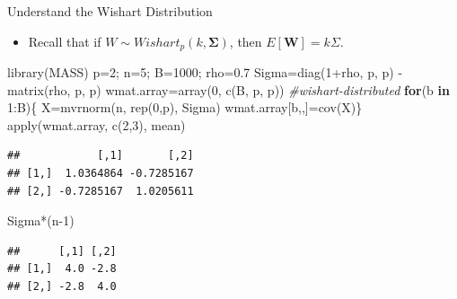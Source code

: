 \documentclass[
  ignorenonframetext,
]{beamer}
\newenvironment{Shaded}{\begin{snugshade}}{\end{snugshade}}
\newcommand{\CommentTok}[1]{\textcolor[rgb]{0.56,0.35,0.01}{\textit{#1}}}
\newcommand{\ControlFlowTok}[1]{\textcolor[rgb]{0.13,0.29,0.53}{\textbf{#1}}}
\newcommand{\DecValTok}[1]{\textcolor[rgb]{0.00,0.00,0.81}{#1}}
\newcommand{\FloatTok}[1]{\textcolor[rgb]{0.00,0.00,0.81}{#1}}
\newcommand{\FunctionTok}[1]{\textcolor[rgb]{0.00,0.00,0.00}{#1}}
\newcommand{\NormalTok}[1]{#1}
\newcommand{\OtherTok}[1]{\textcolor[rgb]{0.56,0.35,0.01}{#1}}
\newcommand{\SpecialCharTok}[1]{\textcolor[rgb]{0.00,0.00,0.00}{#1}}
\providecommand{\tightlist}{%
  \setlength{\itemsep}{0pt}\setlength{\parskip}{0pt}}
\begin{document}
\begin{frame}[fragile]{Understand the Wishart Distribution}
\protect\hypertarget{understand-the-wishart-distribution}{}
\begin{itemize}
\tightlist
\item
  Recall that if \(W\sim Wishart_p(k, \boldsymbol \Sigma)\), then
  \(E[\mathbf W]=k\Sigma\).
\end{itemize}

\tiny

\begin{Shaded}
\begin{Highlighting}[]
\FunctionTok{library}\NormalTok{(MASS)}
\NormalTok{p}\OtherTok{=}\DecValTok{2}\NormalTok{; n}\OtherTok{=}\DecValTok{5}\NormalTok{; B}\OtherTok{=}\DecValTok{1000}\NormalTok{; rho}\OtherTok{=}\FloatTok{0.7}
\NormalTok{Sigma}\OtherTok{=}\FunctionTok{diag}\NormalTok{(}\DecValTok{1}\SpecialCharTok{+}\NormalTok{rho, p, p) }\SpecialCharTok{{-}} \FunctionTok{matrix}\NormalTok{(rho, p, p)}
\NormalTok{wmat.array}\OtherTok{=}\FunctionTok{array}\NormalTok{(}\DecValTok{0}\NormalTok{, }\FunctionTok{c}\NormalTok{(B, p, p)) }\CommentTok{\#wishart{-}distributed}
\ControlFlowTok{for}\NormalTok{(b }\ControlFlowTok{in} \DecValTok{1}\SpecialCharTok{:}\NormalTok{B)\{}
\NormalTok{  X}\OtherTok{=}\FunctionTok{mvrnorm}\NormalTok{(n, }\FunctionTok{rep}\NormalTok{(}\DecValTok{0}\NormalTok{,p), Sigma)}
\NormalTok{  wmat.array[b,,]}\OtherTok{=}\FunctionTok{cov}\NormalTok{(X)\}}
\FunctionTok{apply}\NormalTok{(wmat.array, }\FunctionTok{c}\NormalTok{(}\DecValTok{2}\NormalTok{,}\DecValTok{3}\NormalTok{), mean)}
\end{Highlighting}
\end{Shaded}

\begin{verbatim}
##            [,1]       [,2]
## [1,]  1.0364864 -0.7285167
## [2,] -0.7285167  1.0205611
\end{verbatim}

\begin{Shaded}
\begin{Highlighting}[]
\NormalTok{Sigma}\SpecialCharTok{*}\NormalTok{(n}\DecValTok{{-}1}\NormalTok{)}
\end{Highlighting}
\end{Shaded}

\begin{verbatim}
##      [,1] [,2]
## [1,]  4.0 -2.8
## [2,] -2.8  4.0
\end{verbatim}

\normalsize
\end{frame}
\end{document}
